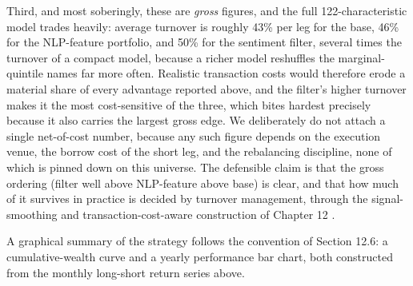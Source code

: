 Third, and most soberingly, these are \textit{gross} figures, and the full 122-characteristic model trades heavily: average turnover is roughly 43\% per leg for the base, 46\% for the NLP-feature portfolio, and 50\% for the sentiment filter, several times the turnover of a compact model, because a richer model reshuffles the marginal-quintile names far more often. Realistic transaction costs would therefore erode a material share of every advantage reported above, and the filter's higher turnover makes it the most cost-sensitive of the three, which bites hardest precisely because it also carries the largest gross edge. We deliberately do not attach a single net-of-cost number, because any such figure depends on the execution venue, the borrow cost of the short leg, and the rebalancing discipline, none of which is pinned down on this universe. The defensible claim is that the gross ordering (filter well above NLP-feature above base) is clear, and that how much of it survives in practice is decided by turnover management, through the signal-smoothing and transaction-cost-aware construction of Chapter 12 \citep{martin2018transaction}.

A graphical summary of the strategy follows the convention of Section 12.6: a cumulative-wealth curve and a yearly performance bar chart, both constructed from the monthly long-short return series above.

